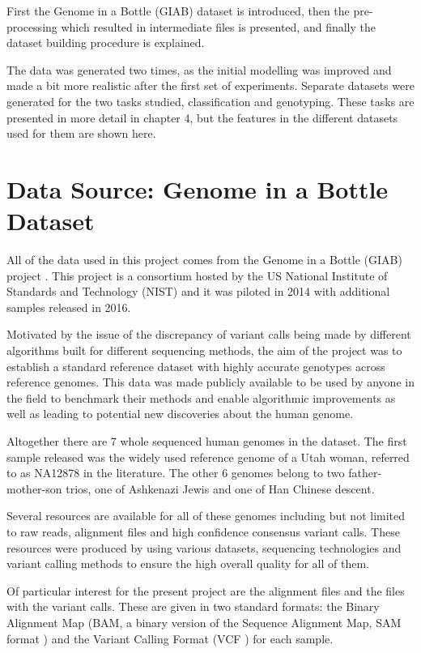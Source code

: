 \documentclass[bsc,frontabs,singlespacing,parskip,deptreport]{infthesis}
\begin{document}
First the Genome in a Bottle (GIAB) dataset is introduced, then the pre-processing which resulted in intermediate files is presented, and finally the dataset building procedure is explained.

The data was generated two times, as the initial modelling was improved and made a bit more realistic after the first set of experiments. Separate datasets were generated for the two tasks studied, classification and genotyping. These tasks are presented in more detail in chapter 4, but the features in the different datasets used for them are shown here.

\section{Data Source: Genome in a Bottle Dataset}

All of the data used in this project comes from the Genome in a Bottle (GIAB) project \cite{giab1} \cite{giab2}. This project is a consortium hosted by the US National Institute of Standards and Technology (NIST) and it was piloted in 2014 with additional samples released in 2016.

Motivated by the issue of the discrepancy of variant calls being made by different algorithms built for different sequencing methods, the aim of the project was to establish a standard reference dataset with highly accurate genotypes across reference genomes. This data was made publicly available to be used by anyone in the field to benchmark their methods and enable algorithmic improvements as well as leading to potential new discoveries about the human genome.

Altogether there are 7 whole sequenced human genomes in the dataset. The first sample released was the widely used reference genome of a Utah woman, referred to as NA12878 in the literature. The other 6 genomes belong to two father-mother-son trios, one of Ashkenazi Jewis and one of Han Chinese descent.

Several resources are available for all of these genomes including but not limited to raw reads, alignment files and high confidence consensus variant calls. These resources were produced by using various datasets, sequencing technologies and variant calling methods to ensure the high overall quality for all of them.

Of particular interest for the present project are the alignment files and the files with
the variant calls. These are given in two standard formats: the Binary Alignment Map (BAM, a binary version of the Sequence Alignment Map, SAM format \cite{sam}) and the Variant Calling Format (VCF \cite{vcf}) for each sample.
\end{document}
